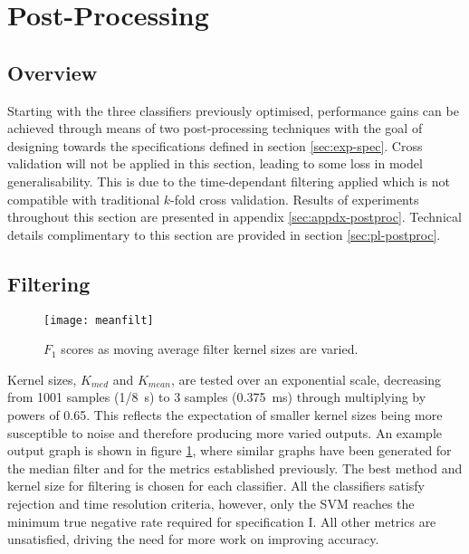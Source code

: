 \section{Post-Processing}
\label{sec:exp-postproc}
    \subsection{Overview}
    \label{subsec:exp-postproc-overview}
        Starting with the three classifiers previously optimised, performance gains can be achieved through means of two post-processing techniques with the goal of designing towards the specifications defined in section \ref{sec:exp-spec}. Cross validation will not be applied in this section, leading to some loss in model generalisability. This is due to the time-dependant filtering applied which is not compatible with traditional $k$-fold cross validation. Results of experiments throughout this section are presented in appendix \ref{sec:appdx-postproc}. Technical details complimentary to this section are provided in section \ref{sec:pl-postproc}.
    \subsection{Filtering}
    \label{subsec:exp-postproc-filt}
        \begin{figure}[ht]
            \centering
            \texttt{[image: meanfilt]}
            \caption{$F_{1}$ scores as moving average filter kernel sizes are varied.}
            \label{fig:exp-postproc-filt}
        \end{figure}
        Kernel sizes, $K_{med}$ and $K_{mean}$, are tested over an exponential scale, decreasing from 1001 samples (\SI{1/8}{\second}) to 3 samples (\SI{0.375}{\milli\second}) through multiplying by powers of 0.65. This reflects the expectation of smaller kernel sizes being more susceptible to noise and therefore producing more varied outputs. An example output graph is shown in figure \ref{fig:exp-postproc-filt}, where similar graphs have been generated for the median filter and for the metrics established previously. The best method and kernel size for filtering is chosen for each classifier. All the classifiers satisfy rejection and time resolution criteria, however, only the SVM reaches the minimum true negative rate required for specification I. All other metrics are unsatisfied, driving the need for more work on improving accuracy.

